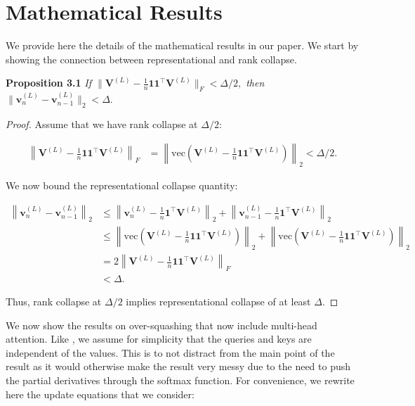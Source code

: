 \documentclass{article} %
\newcommand{\Vb}{\mathbf{V}}
\newcommand{\vecm}[1]{\mathrm{vec}\left(#1\right)}
\begin{document}
\section{Mathematical Results}
\label{app:proofs}

We provide here the details of the mathematical results in our paper. We start by showing the connection between representational and rank collapse.

\textbf{Proposition 3.1}\textit{ If $\|\Vb^{(L)} - \frac{1}{n}\mathbf{1}\mathbf{1}^\top\Vb^{(L)}\|_F < \Delta / 2,$ then $\|\mathbf{v}_n^{(L)} - \mathbf{v}_{n-1}^{(L)}\|_2 < \Delta.$}
\begin{proof}
Assume that we have rank collapse at $\Delta / 2$: 

\begin{align*}
\left \lVert \Vb^{(L)} - \frac{1}{n} \mathbf{1} \mathbf{1}^\top \Vb^{(L)} \right \rVert_F &= \left \lVert \vecm{\Vb^{(L)} - \frac{1}{n} \mathbf{1} \mathbf{1}^\top \Vb^{(L)}} \right \rVert_2 < \Delta / 2.
\end{align*}

We now bound the representational collapse quantity:

\begin{align*}
\left\lVert \mathbf{v}_{n}^{(L)} - \mathbf{v}_{n-1}^{(L)} \right\rVert_2 
&\leq \left\lVert \mathbf{v}_{n}^{(L)} - \frac{1}{n}\mathbf{1}^\top\Vb^{(L)} \right\rVert_2 + \left\lVert \mathbf{v}_{n-1}^{(L)} - \frac{1}{n}\mathbf{1}^\top\Vb^{(L)} \right\rVert_2 \\
&\leq \left\lVert \vecm{\Vb^{(L)} - \frac{1}{n}\mathbf{1}\mathbf{1}^\top\Vb^{(L)}} \right\rVert_2 + \left\lVert \vecm{\Vb^{(L)} - \frac{1}{n}\mathbf{1}\mathbf{1}^\top\Vb^{(L)}} \right\rVert_2 \\
&= 2\left\lVert \Vb^{(L)} - \frac{1}{n}\mathbf{1}\mathbf{1}^\top\Vb^{(L)} \right\rVert_F \\
&< \Delta.
\end{align*}

Thus, rank collapse at $\Delta / 2$ implies representational collapse of at least $\Delta$.
\end{proof}

We now show the results on over-squashing that now include multi-head attention. Like \cite{barbero2024transformers}, we assume for simplicity that the queries and keys are independent of the values. This is to not distract from the main point of the result as it would otherwise make the result very messy due to the need to push the partial derivatives through the softmax function. For convenience, we rewrite here the update equations that we consider:
\end{document}

